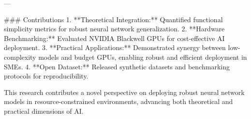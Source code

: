 ---

### Contributions  
1. **Theoretical Integration:** Quantified functional simplicity metrics for robust neural network generalization.  
2. **Hardware Benchmarking:** Evaluated NVIDIA Blackwell GPUs for cost-effective AI deployment.  
3. **Practical Applications:** Demonstrated synergy between low-complexity models and budget GPUs, enabling robust and efficient deployment in SMEs.  
4. **Open Dataset:** Released synthetic datasets and benchmarking protocols for reproducibility.  

This research contributes a novel perspective on deploying robust neural network models in resource-constrained environments, advancing both theoretical and practical dimensions of AI.